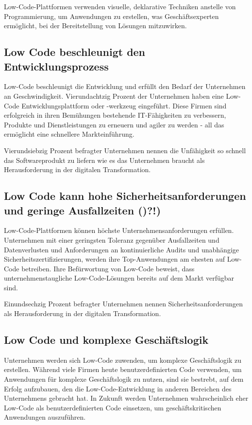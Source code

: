 \documentclass{article}
\begin{document}
	Low-Code-Plattformen verwenden visuelle, deklarative Techniken anstelle von
	Programmierung, um Anwendungen zu erstellen, was Geschäftsexperten ermöglicht, bei der
	Bereitstellung von Lösungen mitzuwirken. \cite{EmmaVanPelt.2019}
	
	\subsection{Low Code beschleunigt den Entwicklungsprozess}	
	Low-Code beschleunigt die Entwicklung und erfüllt den Bedarf der Unternehmen an Geschwindigkeit. Vierundachtzig Prozent der Unternehmen haben eine Low-Code Entwicklungsplattform oder -werkzeug eingeführt. Diese Firmen sind erfolgreich in ihren Bemühungen bestehende IT-Fähigkeiten zu verbessern, Produkte und Dienstleistungen zu erneuern und agiler zu werden - all das ermöglicht eine schnellere Markteinführung. \cite{EmmaVanPelt.2019}
	
	Vierundsiebzig Prozent befragter Unternehmen nennen die Unfähigkeit so schnell das Softwareprodukt zu liefern wie es das Unternehmen braucht als Herausforderung in der digitalen Transformation. \cite{EmmaVanPelt.2019} %
	
	\subsection{Low Code kann hohe Sicherheitsanforderungen und geringe Ausfallzeiten ()?!)} 
	Low-Code-Plattformen können höchste Unternehmensanforderungen erfüllen. Unternehmen mit einer geringsten Toleranz gegenüber Ausfallzeiten und Datenverlusten und Anforderungen an kontinuierliche Audits und unabhängige Sicherheitszertifizierungen, werden ihre Top-Anwendungen am ehesten auf
	Low-Code betreiben. Ihre Befürwortung von Low-Code beweist, dass unternehmenstaugliche 	Low-Code-Lösungen bereits auf dem Markt verfügbar sind.  \cite{EmmaVanPelt.2019}
	
	Einundsechzig Prozent befragter Unternehmen nennen Sicherheitsanforderungen als Herausforderung in der digitalen Transformation. \cite{EmmaVanPelt.2019} %
	
	
	\subsection{Low Code und komplexe Geschäftslogik}
	Unternehmen werden sich Low-Code zuwenden, um komplexe Geschäftslogik zu erstellen.
	Während viele Firmen heute benutzerdefinierten Code verwenden, um Anwendungen für komplexe
	Geschäftslogik zu nutzen, sind sie bestrebt, auf dem Erfolg aufzubauen, den die Low-Code-Entwicklung in anderen Bereichen des Unternehmens gebracht hat. In Zukunft werden Unternehmen wahrscheinlich eher Low-Code als benutzerdefinierten Code einsetzen, um geschäftskritischen Anwendungen auszuführen. \cite{EmmaVanPelt.2019}
	
\end{document}
